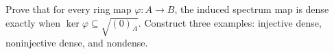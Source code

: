 \begin{problem}\label{chal:vi19-c03}
Prove that for every ring map $\varphi:A\to B$, the induced spectrum map is dense exactly when $\ker\varphi\subseteq\sqrt{(0)_A}$.  Construct three examples: injective dense, noninjective dense, and nondense.
\end{problem}


